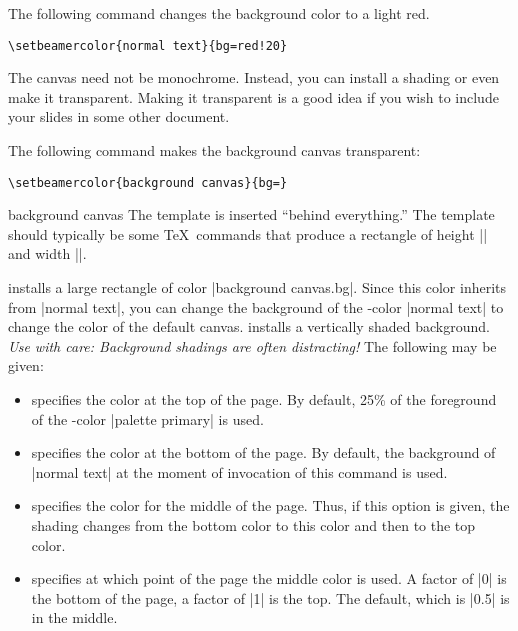 \example The following command changes the background color to a light
red.
\begin{verbatim}
\setbeamercolor{normal text}{bg=red!20} 
\end{verbatim}

The canvas need not be monochrome. Instead, you can install a shading
or even make it transparent. Making it transparent is a good idea if
you wish to include your slides in some other document.

\example The following command makes the background canvas transparent:
\begin{verbatim}
\setbeamercolor{background canvas}{bg=} 
\end{verbatim}

\begin{template*}{background canvas}
  The template is inserted ``behind everything.'' The template should
  typically be some \TeX\ commands that produce a rectangle of height
  |\paperheight| and width |\paperwidth|.

  \begin{templateoptions}
    installs a large rectangle of color |background canvas.bg|. Since
    this color inherits from |normal text|, you can change the
    background of the \beamer-color |normal text| to change the
    color of the default canvas.
    installs a vertically shaded background. \emph{Use with care:
      Background shadings are often distracting!} The following
     may be given:
    \begin{itemize}
    \item {} specifies the color at the
      top of the page. By default, 25\% of the foreground of the
      \beamer-color |palette primary| is used.
    \item {} specifies the color at the
      bottom of the page. By default, the background of
      |normal text| at the moment of invocation of this command is
      used. 
    \item {} specifies the color
      for the middle of the page. Thus, if this option is given, the
      shading changes from the bottom color to this color and then
      to the top color.
    \item {} specifies at which
      point of the page the middle color is used. A factor of |0| is
      the bottom of the page, a factor of |1| is the top. The
      default, which is |0.5| is in the middle.
    \end{itemize}
  \end{templateoptions}  
\end{template*}

